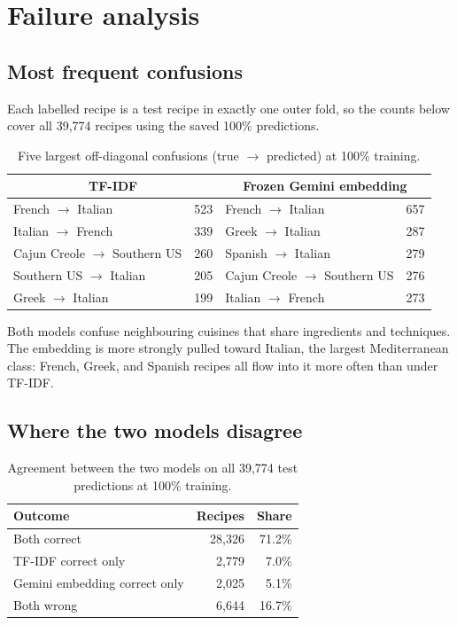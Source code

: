 \documentclass[11pt,letterpaper]{article}
\newcommand{\tfidf}{TF-IDF}
\newcommand{\embed}{Gemini embedding}
\begin{document}
\section{Failure analysis}
\subsection{Most frequent confusions}
Each labelled recipe is a test recipe in exactly one outer fold, so the counts below cover all 39,774 recipes using the saved 100\% predictions.

\begin{table}[H]
\centering
\caption{Five largest off-diagonal confusions (true $\rightarrow$ predicted) at 100\% training.}
\label{tab:confusions}
\small
\begin{tabular}{@{}lr@{\qquad}lr@{}}
\toprule
\multicolumn{2}{c}{\tfidf{}} & \multicolumn{2}{c}{Frozen \embed{}} \\
\midrule
French $\rightarrow$ Italian & 523 & French $\rightarrow$ Italian & 657 \\
Italian $\rightarrow$ French & 339 & Greek $\rightarrow$ Italian & 287 \\
Cajun Creole $\rightarrow$ Southern US & 260 & Spanish $\rightarrow$ Italian & 279 \\
Southern US $\rightarrow$ Italian & 205 & Cajun Creole $\rightarrow$ Southern US & 276 \\
Greek $\rightarrow$ Italian & 199 & Italian $\rightarrow$ French & 273 \\
\bottomrule
\end{tabular}
\end{table}

Both models confuse neighbouring cuisines that share ingredients and techniques. The embedding is more strongly pulled toward Italian, the largest Mediterranean class: French, Greek, and Spanish recipes all flow into it more often than under \tfidf{}.

\subsection{Where the two models disagree}

\begin{table}[H]
\centering
\caption{Agreement between the two models on all 39,774 test predictions at 100\% training.}
\label{tab:agreement}
\small
\begin{tabular}{@{}lrr@{}}
\toprule
Outcome & Recipes & Share \\
\midrule
Both correct & 28,326 & 71.2\% \\
\tfidf{} correct only & 2,779 & 7.0\% \\
\embed{} correct only & 2,025 & 5.1\% \\
Both wrong & 6,644 & 16.7\% \\
\bottomrule
\end{tabular}
\end{table}
\end{document}
